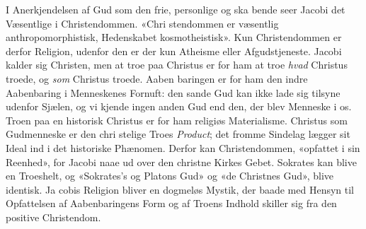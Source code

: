 \documentclass[12pt,a4paper]{book}
\begin{document}
I Anerkjendelsen af Gud som den frie, personlige og ska\-%
bende seer Jacobi det Væsentlige i Christendommen. «Chri\-%
stendommen er væsentlig anthropomorphistisk, Hedenskabet
kosmotheistisk». Kun Christendommen er derfor Religion,
udenfor den er der kun Atheisme eller Afgudstjeneste. Jacobi
kalder sig Christen, men at troe paa Christus er for ham at
troe \emph{hvad} Christus troede, og \emph{som} Christus troede. Aaben\-%
baringen er for ham den indre Aabenbaring i Menneskenes
Fornuft: den sande Gud kan ikke lade sig tilsyne udenfor
Sjælen, og vi kjende ingen anden Gud end den, der blev
Menneske i os. Troen paa en historisk Christus er for ham
religiøs Materialisme. Christus som Gudmenneske er den chri\-%
stelige Troes \emph{Product}; det fromme Sindelag lægger sit Ideal
ind i det historiske Phænomen. Derfor kan Christendommen,
«opfattet i sin Reenhed», for Jacobi naae ud over den christne
Kirkes Gebet. Sokrates kan blive en Troeshelt, og «Sokrates's
og Platons Gud» og «de Christnes Gud», blive identisk. Ja\-%
cobis Religion bliver en dogmeløs Mystik, der baade med
Hensyn til Opfattelsen af Aabenbaringens Form og af Troens
Indhold skiller sig fra den positive Christendom.
\end{document}
